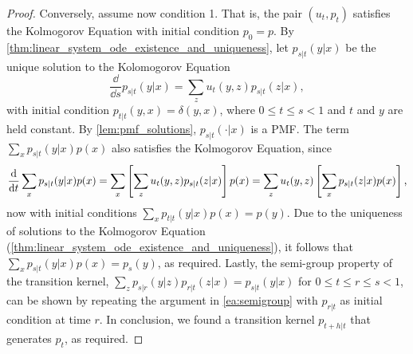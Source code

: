 \documentclass{fairmeta}
\renewcommand{\eqref}[1]{\labelcref{#1}}
\numberwithin{equation}{section}
\begin{document}
\begin{proof}
Conversely, assume now condition 1.
That is, the pair $(u_t,p_t)$ satisfies the Kolmogorov Equation \eqref{e:kolmogorov} with initial condition $p_0=p$.
By \cref{thm:linear_system_ode_existence_and_uniqueness}, let $p_{s|t}(y|x)$ be the unique solution to the Kolomogorov Equation
\begin{equation}
    \frac{\dd}{\dd s}p_{s|t}(y|x) = \sum_z u_t(y,z) p_{s|t}(z|x),
\end{equation}
with initial condition $p_{t|t}(y,x)=\delta(y,x)$, where $0\leq t \leq s < 1$ and $t$ and $y$ are held constant.
By \cref{lem:pmf_solutions}, $p_{s|t}(\cdot|x)$ is a PMF.
The term $\sum_x p_{s|t}(y|x)p(x)$ also satisfies the Kolmogorov Equation, since
\begin{equation}\label{ea:semigroup}
    \frac{\mathrm{d}}{\mathrm{d} t}\sum_x p_{s|t}(y|x)p(x) = \sum_x \left [\sum_z u_t(y,z)p_{s|t}(z|x)\right ]p(x) = \sum_z u_t(y,z) \left [\sum_x p_{s|t}(z|x) p(x)\right ],
\end{equation}
now with initial conditions $\sum_x p_{t|t}(y|x)p(x) = p(y)$.
Due to the uniqueness of solutions to the Kolmogorov Equation (\cref{thm:linear_system_ode_existence_and_uniqueness}), it follows that $\sum_x p_{s|t}(y|x) p(x) = p_s(y)$, as required.
Lastly, the semi-group property of the transition kernel, $\sum_z p_{s|r}(y|z) p_{r|t}(z|x) = p_{s|t}(y|x)$ for $0\leq t\leq r\leq s < 1$, can be shown by repeating the argument in \ref{ea:semigroup} with $p_{r|t}$ as initial condition at time $r$. In conclusion, we found a transition kernel $p_{t+h|t}$ that generates $p_t$, as required.  
\end{proof}
\end{document}
